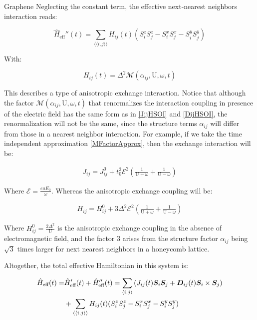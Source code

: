 \begin{section}{Graphene}
Neglecting the constant term, the effective next-nearest neighbors interaction reads:

\begin{equation}
\hat{H}_{\text{eff}}''(t) = \sum_{\langle \langle i,j \rangle \rangle} H_{ij}(t) (S_i^zS_j^z - S_i^xS_j^x - S_i^yS_j^y)
\end{equation}

With:

\begin{equation}
H_{ij}(t) = \Delta^2 \mathcal{M}(\alpha_{ij}, \text{U}, \omega, t)
\end{equation}

This describes a type of anisotropic exchange interaction. Notice that although the factor $\mathcal{M}(\alpha_{ij}, \text{U}, \omega, t)$ that renormalizes the interaction coupling in presence of the electric field has the same form as in \ref{JijHSOI} and \ref{DijHSOI}, the renormalization will not be the same, since the structure terms $\alpha_{ij}$ will differ from those in a nearest neighbor interaction. For example, if we take the time independent approximation \ref{MFactorApprox}, then the exchange interaction will be:

\begin{align*}
J_{ij} = J_{ij}^0 + t_0^2 \mathcal{E}^2 \left( \frac{1}{\text{U}+\omega} + \frac{1}{\text{U}-\omega} \right)
\end{align*}

Where $\mathcal{E} = \frac{eaE_0}{\omega}$. Whereas the anisotropic exchange coupling will be:

\begin{align*}
H_{ij} = H_{ij}^0 + 3 \Delta^2 \mathcal{E}^2 \left( \frac{1}{\text{U}+\omega} + \frac{1}{\text{U}-\omega} \right)
\end{align*}

Where $H_{ij}^0 = \frac{2\Delta^2}{\text{U}}$ is the anisotropic exchange coupling in the absence of electromagnetic field, and the factor $3$ arises from the structure factor $\alpha_{ij}$ being $\sqrt{3}$ times larger for next nearest neighbors in a honeycomb lattice.

Altogether, the total effective Hamiltonian in this system is:

\begin{align}
\hat{H}_{\text{eff}}(t) = &\hat{H}_{\text{eff}}'(t) + \hat{H}_{\text{eff}}''(t) = \sum_{\langle i,j \rangle} \left( J_{ij}(t)\boldsymbol{S}_i\boldsymbol{S}_j + \boldsymbol{D}_{ij}(t) \boldsymbol{S}_i \times \boldsymbol{S}_j \right) \nonumber \\
&+ \sum_{\langle \langle i,j \rangle \rangle} H_{ij}(t) (S_i^zS_j^z - S_i^xS_j^x - S_i^yS_j^y)
\end{align}


\end{section}
